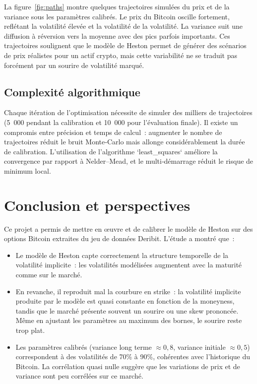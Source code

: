 \documentclass[12pt,a4paper]{article}
\begin{document}
La figure~\ref{fig:paths} montre quelques trajectoires simulées du prix et de la variance sous les paramètres calibrés.  Le prix du Bitcoin oscille fortement, reflétant la volatilité élevée et la volatilité de la volatilité.  La variance suit une diffusion à réversion vers la moyenne avec des pics parfois importants.  Ces trajectoires soulignent que le modèle de Heston permet de générer des scénarios de prix réalistes pour un actif crypto, mais cette variabilité ne se traduit pas forcément par un sourire de volatilité marqué.

\subsection{Complexité algorithmique}

Chaque itération de l'optimisation nécessite de simuler des milliers de trajectoires (5 000 pendant la calibration et 10 000 pour l'évaluation finale).  Il existe un compromis entre précision et temps de calcul : augmenter le nombre de trajectoires réduit le bruit Monte‑Carlo mais allonge considérablement la durée de calibration.  L'utilisation de l'algorithme `least\_squares` améliore la convergence par rapport à Nelder--Mead, et le multi‑démarrage réduit le risque de minimum local.

\section{Conclusion et perspectives}

Ce projet a permis de mettre en œuvre et de calibrer le modèle de Heston sur des options Bitcoin extraites du jeu de données Deribit.  L'étude a montré que :
\begin{itemize}
  \item Le modèle de Heston capte correctement la structure temporelle de la volatilité implicite : les volatilités modélisées augmentent avec la maturité comme sur le marché.
  \item En revanche, il reproduit mal la courbure en strike : la volatilité implicite produite par le modèle est quasi constante en fonction de la moneyness, tandis que le marché présente souvent un sourire ou une skew prononcée.  Même en ajustant les paramètres au maximum des bornes, le sourire reste trop plat.
  \item Les paramètres calibrés (variance long terme \(\approx0,8\), variance initiale \(\approx0,5\)) correspondent à des volatilités de 70\% à 90\%, cohérentes avec l'historique du Bitcoin.  La corrélation quasi nulle suggère que les variations de prix et de variance sont peu corrélées sur ce marché.
\end{itemize}
\end{document}
